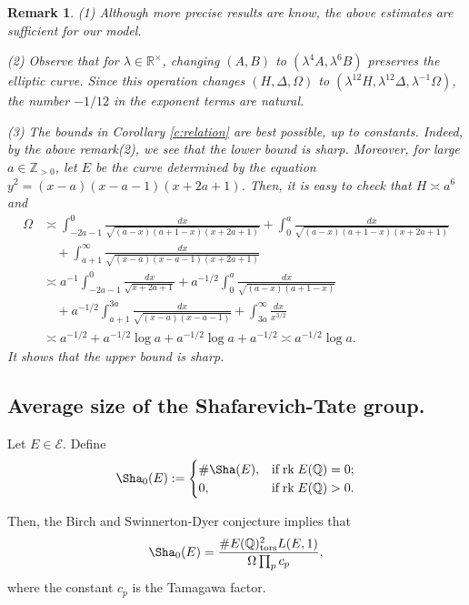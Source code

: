 \documentclass[12pt,reqno]{amsart}
\newtheorem{remark}[thm]{Remark}
\numberwithin{equation}{section}
\def\R{{\mathbb R}}
\def\Z{{\mathbb Z}}
\def\Q{{\mathbb Q}}
\def\sE{{\mathscr E}}
\begin{document}
\begin{remark}
{\rm (1) Although more precise results are know, the above estimates are sufficient for our model.

(2) Observe that for $\lambda \in \R^\times$, changing $(A,B)$ to $(\lambda^4 A, \lambda^6 B)$ preserves the elliptic curve. Since this operation changes $(H, \Delta, \Omega)$ to $(\lambda^{12} H, \lambda^{12} \Delta, \lambda^{-1}\Omega)$, the number $-1/12$ in the exponent terms are natural.

(3) The bounds in Corollary \ref{c:relation} are best possible, up to constants. Indeed, by the above remark(2), we see that the lower bound is sharp. Moreover, for large $a \in \Z_{>0}$, let $E$ be the curve determined by the equation $y^2 = (x-a)(x-a-1)(x+2a+1)$. Then, it is easy to check that $H \asymp a^6$ and
\begin{align*}
\Omega &\asymp \int_{-2a-1}^0 \frac{dx}{\sqrt{(a-x)(a+1-x)(x+2a+1)}} + \int_{0}^a \frac{dx}{\sqrt{(a-x)(a+1-x)(x+2a+1)}} \\
&\quad + \int_{a+1}^\infty \frac{dx}{\sqrt{(x-a)(x-a-1)(x+2a+1)}} \\
& \asymp a^{-1} \int_{-2a-1}^0 \frac{dx}{\sqrt{x+2a+1}} + a^{-1/2}\int_{0}^a \frac{dx}{\sqrt{(a-x)(a+1-x)}} \\
& \quad + a^{-1/2}\int_{a+1}^{3a} \frac{dx}{\sqrt{(x-a)(x-a-1)}} + \int_{3a}^{\infty} \frac{dx}{x^{3/2}}\\
& \asymp a^{-1/2} + a^{-1/2}\log a  + a^{-1/2}\log a + a^{-1/2} \asymp a^{-1/2}\log a.
\end{align*}
It shows that the upper bound is sharp. 
}
\end{remark}


\subsection{Average size of the Shafarevich-Tate group.}

Let $E \in \sE$. Define
\begin{align*}
\Sha_0(E):= \begin{cases}
\# \Sha(E), & \mbox{if} \; \text{rk} \; E(\Q) = 0; \\
0, & \mbox{if} \; \text{rk} \; E(\Q) > 0.
\end{cases}
\end{align*}

Then, the Birch and Swinnerton-Dyer conjecture implies that
\begin{align*}
\Sha_0(E) = \frac{\# E(\Q)^2_{\text{tors}} L(E,1)}{\Omega \prod_p c_p}, 
\end{align*}
where the constant $c_p$ is the Tamagawa factor.
\end{document}
